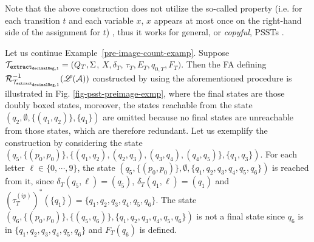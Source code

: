 
Note that the above construction  does not utilize the so-called  property (i.e. for each transition $t$ and each variable $x$, $x$ appears at most once on the right-hand side of the assignment for $t$) \cite{AC10,AD11}, 
  thus it works for general, or \textit{copyful}, PSSTs \cite{FR17}.

\begin{example}
Let us continue Example~\ref{pre-image-count-examp}. Suppose $\mathcal{T}_{\tt extract_{decimalReg,1}} = (Q_T, \Sigma$, $X, \delta_T$, $\tau_T, E_T,  q_{0, T}, F_T)$. Then the FA defining $\mathcal{R}^{-1}_{\mathcal{T}_{\tt extract_{decimalReg,1}}}(\mathscr{L}(\mathcal{A}))$ constructed by using the aforementioned procedure is illustrated in Fig. \ref{fig-psst-preimage-exmp}, where the final states are those doubly boxed states, moreover, the states reachable from the state $(q_2, \emptyset, \{(q_1,q_2)\}, \{q_1\})$ are omitted because no final states are unreachable from those states, which are therefore redundant. Let us exemplify the construction by considering the state $(q_5, \{(p_0,p_0)\}, \{(q_1,q_2), (q_2,q_3), (q_3,q_4), (q_4, q_5)\}, \{q_1,q_3\})$. For each letter $\ell \in \{0,\cdots, 9\}$, the state $(q_5, \{(p_0,p_0)\}, \emptyset, \{q_1,q_2, q_3, q_4, q_5, q_6\})$ is reached from it, since $\delta_T(q_5,\ell)  = (q_5)$, $\delta_T(q_1,\ell) = (q_1)$ and $(\tau^{(ip)}_T)^*(\{q_1\}) = \{q_1, q_2, q_3, q_4, q_5, q_6\}$. The state $(q_6, \{(p_0,p_0)\}, \{(q_5,q_6)\}, \{q_1, q_2, q_3, q_4, q_5, q_6\})$ is not a final state since $q_6$ is in $\{q_1, q_2, q_3, q_4, q_5, q_6\}$ and $F_T(q_6)$ is defined.
%
\begin{figure}[ht]
\centering
\vspace{-4mm}

\end{figure}
\end{example}
